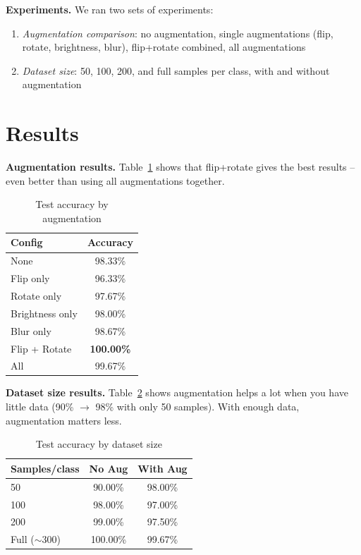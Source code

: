 \documentclass[11pt, a4paper, twocolumn]{article}
\begin{document}
\textbf{Experiments.} We ran two sets of experiments:
\begin{enumerate}
    \item \textit{Augmentation comparison}: no augmentation, single augmentations (flip, rotate, brightness, blur), flip+rotate combined, all augmentations
    \item \textit{Dataset size}: 50, 100, 200, and full samples per class, with and without augmentation
\end{enumerate}

\section*{Results}
\textbf{Augmentation results.} Table~\ref{tab:augmentation} shows that flip+rotate gives the best results -- even better than using all augmentations together.

\begin{table}[h]
\centering
\caption{Test accuracy by augmentation}
\label{tab:augmentation}
\begin{tabular}{@{}lc@{}}
\toprule
Config & Accuracy \\
\midrule
None & 98.33\% \\
Flip only & 96.33\% \\
Rotate only & 97.67\% \\
Brightness only & 98.00\% \\
Blur only & 98.67\% \\
Flip + Rotate & \textbf{100.00\%} \\
All & 99.67\% \\
\bottomrule
\end{tabular}
\end{table}

\textbf{Dataset size results.} Table~\ref{tab:datasize} shows augmentation helps a lot when you have little data (90\% $\rightarrow$ 98\% with only 50 samples). With enough data, augmentation matters less.

\begin{table}[h]
\centering
\caption{Test accuracy by dataset size}
\label{tab:datasize}
\begin{tabular}{@{}lcc@{}}
\toprule
Samples/class & No Aug & With Aug \\
\midrule
50 & 90.00\% & 98.00\% \\
100 & 98.00\% & 97.00\% \\
200 & 99.00\% & 97.50\% \\
Full ($\sim$300) & 100.00\% & 99.67\% \\
\bottomrule
\end{tabular}
\end{table}
\end{document}
